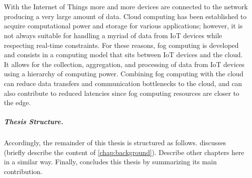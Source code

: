 \chapter{\introductionname}
\label{chap:introduction}

With the Internet of Things more and more devices are connected to the network producing a very large amount of data. Cloud computing has been
established to acquire computational power and storage for various applications; however, it is not always suitable for handling a myriad of data
from IoT devices while respecting real-time constraints.
For these reasons, fog computing is developed and consists in a computing model that sits between IoT devices and the cloud.
It allows for the collection, aggregation, and processing of data from IoT devices using a hierarchy of computing power.
Combining fog computing with the cloud can reduce data transfers and communication bottlenecks to the cloud, and can also contribute to reduced
latencies since fog computing resources are closer to the edge.

%
\paragraph{Thesis Structure.} %
%
Accordingly, the remainder of this thesis is structured as follows.
%
 discusses (briefly describe the content of \cref{chap:background}).
%
Describe other chapters here in a similar way.
%
Finally,  concludes this thesis by summarizing its main contribution.